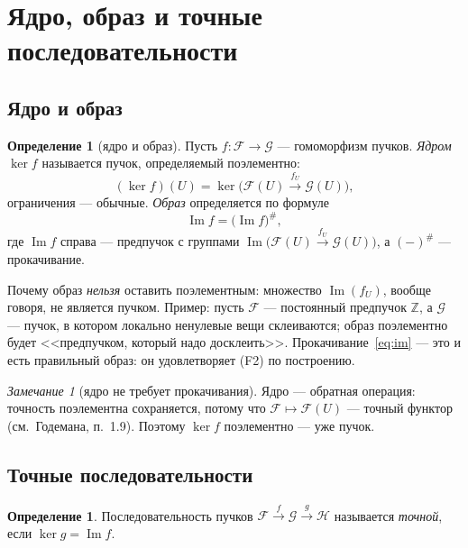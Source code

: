 \documentclass[11pt,b5paper]{article}
\newcommand{\Shv}[1]{\mathscr{#1}}   %
\theoremstyle{plain}
\theoremstyle{definition}
\newtheorem{defninner}[thminner]{Определение}
\theoremstyle{remark}
\newtheorem{reminner}[thminner]{Замечание}
\newcommand{\thmbeg}{%
  \par\smallskip
  \begin{lrbox}{\thmbox}%
  \begin{minipage}{\linewidth}}
\newcommand{\thmend}{%
  \end{minipage}%
  \end{lrbox}%
  \noindent\usebox{\thmbox}%
  \par\smallskip}
\newenvironment{defn}{\thmbeg\begin{defninner}}{\end{defninner}\thmend}
\newenvironment{rem}{\thmbeg\begin{reminner}}{\end{reminner}\thmend}
\let\brutsection\section
\renewcommand{\section}{\Needspace{7\baselineskip}\brutsection}
\let\brutsubsection\subsection
\renewcommand{\subsection}{\Needspace{5\baselineskip}\brutsubsection}
\begin{document}
\section{Ядро, образ и точные последовательности}

\subsection{Ядро и образ}
\leavevmode\par
\begin{defn}[ядро и образ]
Пусть $f\colon\Shv{F}\to\Shv{G}$ --- гомоморфизм пучков.
\emph{Ядром} $\ker f$ называется пучок, определяемый поэлементно:
\begin{equation}\label{eq:ker}
 (\ker f)(U)=\ker\bigl(\Shv{F}(U)\xrightarrow{f_U}\Shv{G}(U)\bigr),
\end{equation}
ограничения --- обычные. \emph{Образ} определяется по формуле
\begin{equation}\label{eq:im}
 \operatorname{Im}f=\bigl(\operatorname{Im}f\bigr)^{\#},
\end{equation}
где $\operatorname{Im}f$ справа --- предпучок с группами
$\operatorname{Im}\bigl(\Shv{F}(U)\xrightarrow{f_U}\Shv{G}(U)\bigr)$,
а $({-})^{\#}$ --- прокачивание.
\end{defn}

Почему образ \emph{нельзя} оставить поэлементным: множество
$\operatorname{Im}(f_U)$, вообще говоря, не является пучком. Пример:
пусть $\Shv{F}$ --- постоянный предпучок $\mathbb{Z}$, а
$\Shv{G}$ --- пучок, в котором локально ненулевые вещи склеиваются;
образ поэлементно будет <<предпучком, который надо досклеить>>.
Прокачивание~\eqref{eq:im} --- это и есть правильный образ: он
удовлетворяет (F2) по построению.

\begin{rem}[ядро не требует прокачивания]
Ядро --- обратная операция: точность поэлементна сохраняется, потому
что $\Shv{F}\mapsto\Shv{F}(U)$ --- точный функтор (см.~Годемана,
п.~1.9). Поэтому $\ker f$ поэлементно --- уже пучок.
\end{rem}

\subsection{Точные последовательности}
\leavevmode\par
\begin{defn}
Последовательность пучков
$\Shv{F}\xrightarrow{\ f\ }\Shv{G}\xrightarrow{\ g\ }\Shv{H}$
называется \emph{точной}, если $\ker g=\operatorname{Im}f$.
\end{defn}
\end{document}
